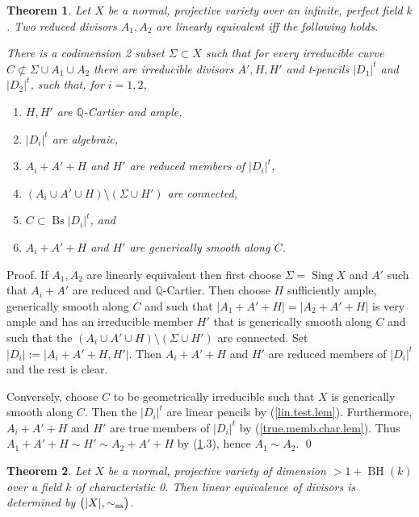 \documentclass{amsart}
\newtheorem{thm}{Theorem}%
\theoremstyle{definition}
\theoremstyle{remark}
\newcommand{\q}[0]{{\mathbb Q}}
\newcommand{\bs}[0]{\operatorname{Bs}}
\newcommand{\sing}[0]{\operatorname{Sing}}
\newcommand{\BH}[0]{\operatorname{BH}}
\newcommand{\simsa}[0]{\sim_{\rm sa}}
\begin{document}
\begin{thm} \label{lin.eq.thm}
Let $X$ be a normal, projective variety over an infinite, perfect   field $k$. 
Two reduced divisors $A_1, A_2$ are linearly equivalent iff the following holds.

There is a codimension 2 subset $\Sigma\subset X$ such that for every
irreducible curve $C\not\subset \Sigma\cup A_1\cup A_2$  there are 
irreducible  divisors $A', H, H'$ and  t-pencils  $|D_1|^t$ and $|D_2|^t$, such that, for $i=1,2$,
\begin{enumerate}
\item $H, H'$ are $\q$-Cartier and ample,
\item $ |D_i|^t$ are algebraic, 
\item $A_i+A'+H$ and $H'$ are reduced members of $ |D_i|^t$,  
\item $(A_i\cup A'\cup H)\setminus (\Sigma\cup H')$ are connected, 
\item  $C\subset \bs |D_i|^t$, and
\item $A_i+A'+H$ and $H'$ are   generically smooth along $C$.
\end{enumerate}
\end{thm}

Proof. If $A_1, A_2$ are linearly equivalent then first choose
$\Sigma=\sing X$ and $A'$ such that $A_i+A'$ are reduced and  $\q$-Cartier.  Then choose 
$H$ sufficiently ample, generically smooth along  $C$ and
such that $|A_1+A'+H|=|A_2+A'+H|$ is very  ample and has an irreducible 
 member $H'$ that is  generically smooth  along  $C$ and such that the $(A_i\cup A'\cup H)\setminus (\Sigma\cup H')$ are connected. Set $|D_i|:=|A_i+A'+H, H'|$. 
Then $A_i+A'+H$ and $H'$ are reduced members of $ |D_i|^t$  and the rest is clear.


Conversely, choose $C$ to be geometrically irreducible such that $X$ is generically smooth along $C$. Then the $|D_i|^t$ are linear pencils by
(\ref{lin.test.lem}). Furthermore,   $A_i+A'+H$ and $H'$ are true members of $ |D_i|^t$ by (\ref{true.memb.char.lem}). Thus  
$A_1+A'+H\sim H'\sim A_2+A'+H$ by (\ref{lin.eq.thm}.3),  hence
$A_1\sim A_2$. \qed




\begin{thm} \label{lineq.top.prop.thm}
Let  $X$ be a normal, projective variety of dimension $>1+\BH(k)$ over a  field $k$ of characteristic 0.  Then linear equivalence of divisors is determined by  $\bigl(|X|, \simsa\bigr)$. 
\end{thm}
\end{document}
